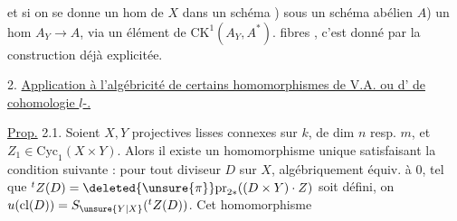 et si on se donne un hom de $X$ dans un  schéma ) sous un schéma abélien $A$) un hom $A_Y\longrightarrow A$, via un élément de ${\mathrm{CK}}^1(A_Y,A^*)$.  fibres , c'est donné par la construction déjà explicitée\deleted{\unsure{)}}.

2. \uline{Application à l'algébricité de certains homomorphismes de V.A. ou d' de cohomologie $l$-.}


\uline{Prop.} 2.1. Soient $X,Y$ projectives lisses connexes sur $k$, de dim $n$ resp. $m$, et  $Z_1\in\mathrm{Cyc}_1(X\times Y)$. Alors il existe un homomorphisme
unique
satisfaisant la condition suivante : pour tout diviseur $D$ sur $X$, algébriquement équiv. à $0$, tel que $ {}^{t}Z(D)=\deleted{\unsure{\pi}}\mathrm{pr}_{2*}((D\times Y)\cdot Z)$ soit défini, on  $u(\mathrm{cl}(D))=S_{\unsure{Y|X}}({}^{t}Z(D))$. Cet homomorphisme
